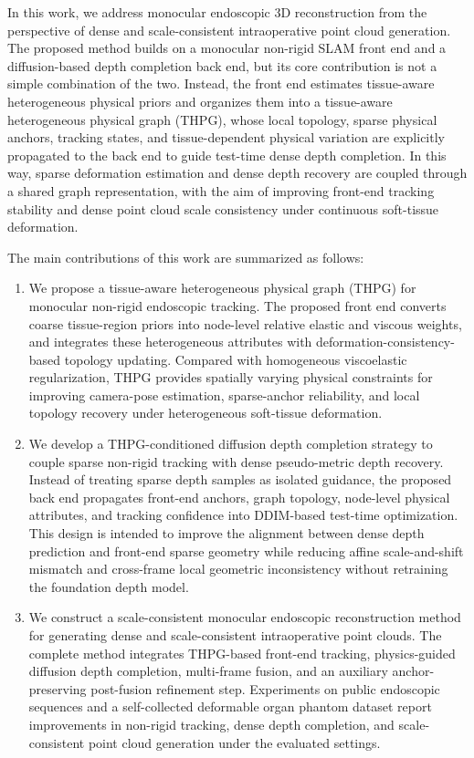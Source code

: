 \documentclass[pdflatex,sn-mathphys-num]{sn-jnl}
\begin{document}
In this work, we address monocular endoscopic 3D reconstruction from the perspective of dense and scale-consistent intraoperative point cloud generation. The proposed method builds on a monocular non-rigid SLAM front end and a diffusion-based depth completion back end, but its core contribution is not a simple combination of the two. Instead, the front end estimates tissue-aware heterogeneous physical priors and organizes them into a tissue-aware heterogeneous physical graph (THPG), whose local topology, sparse physical anchors, tracking states, and tissue-dependent physical variation are explicitly propagated to the back end to guide test-time dense depth completion. In this way, sparse deformation estimation and dense depth recovery are coupled through a shared graph representation, with the aim of improving front-end tracking stability and dense point cloud scale consistency under continuous soft-tissue deformation.

The main contributions of this work are summarized as follows:
\begin{enumerate}
    \item We propose a tissue-aware heterogeneous physical graph (THPG) for monocular non-rigid endoscopic tracking. The proposed front end converts coarse tissue-region priors into node-level relative elastic and viscous weights, and integrates these heterogeneous attributes with deformation-consistency-based topology updating. Compared with homogeneous viscoelastic regularization, THPG provides spatially varying physical constraints for improving camera-pose estimation, sparse-anchor reliability, and local topology recovery under heterogeneous soft-tissue deformation.

    \item We develop a THPG-conditioned diffusion depth completion strategy to couple sparse non-rigid tracking with dense pseudo-metric depth recovery. Instead of treating sparse depth samples as isolated guidance, the proposed back end propagates front-end anchors, graph topology, node-level physical attributes, and tracking confidence into DDIM-based test-time optimization. This design is intended to improve the alignment between dense depth prediction and front-end sparse geometry while reducing affine scale-and-shift mismatch and cross-frame local geometric inconsistency without retraining the foundation depth model.

    \item We construct a scale-consistent monocular endoscopic reconstruction method for generating dense and scale-consistent intraoperative point clouds. The complete method integrates THPG-based front-end tracking, physics-guided diffusion depth completion, multi-frame fusion, and an auxiliary anchor-preserving post-fusion refinement step. Experiments on public endoscopic sequences and a self-collected deformable organ phantom dataset report improvements in non-rigid tracking, dense depth completion, and scale-consistent point cloud generation under the evaluated settings.
\end{enumerate}
\end{document}

